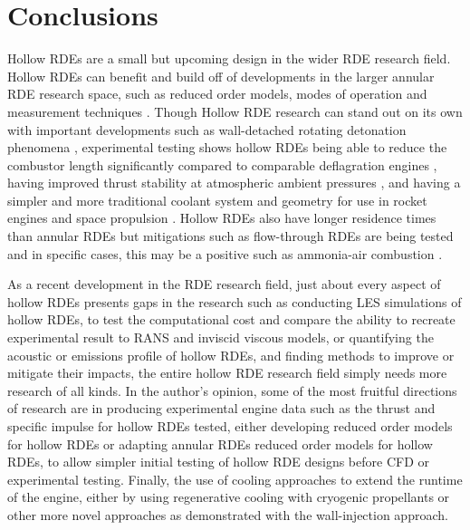 \documentclass{article}
\begin{document}
 
\section{Conclusions}

Hollow RDEs are a small but upcoming design in the wider RDE research field. Hollow RDEs can benefit and build off of developments in the larger annular RDE research space, such as reduced order models, modes of operation and measurement techniques \cite{Huang2019,1Huang2019}. Though Hollow RDE research can stand out on its own with important developments such as wall-detached rotating detonation phenomena \cite{1Huang2023}, experimental testing shows hollow RDEs being able to reduce the combustor length significantly compared to comparable deflagration engines \cite{Ishihara2023}, having improved thrust stability at atmospheric ambient pressures \cite{Sun2019}, and having a simpler and more traditional coolant system and geometry for use in rocket engines and space propulsion \cite{Shao2011}. Hollow RDEs also have longer residence times than annular RDEs but mitigations such as flow-through RDEs are being tested \cite{Betancourt2021} and in specific cases, this may be a positive such as ammonia-air combustion \cite{Gubbi2023}.
\par

As a recent development in the RDE research field, just about every aspect of hollow RDEs presents gaps in the research such as conducting LES simulations of hollow RDEs, to test the computational cost and compare the ability to recreate experimental result to RANS and inviscid viscous models, or quantifying the acoustic or emissions profile of hollow RDEs, and finding methods to improve or mitigate their impacts, the entire hollow RDE research field simply needs more research of all kinds. In the author's opinion, some of the most fruitful directions of research are in producing experimental engine data such as the thrust and specific impulse for hollow RDEs tested, either developing reduced order models for hollow RDEs or adapting annular RDEs reduced order models for hollow RDEs, to allow simpler initial testing of hollow RDE designs before CFD or experimental testing. Finally, the use of cooling approaches to extend the runtime of the engine, either by using regenerative cooling with cryogenic propellants or other more novel approaches as demonstrated with the wall-injection approach.
\par

\end{document}
